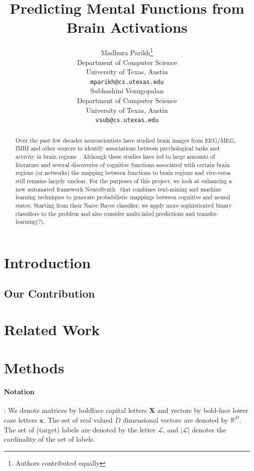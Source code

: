 \documentclass{article} %
\title{Predicting Mental Functions from Brain Activations}
\author{
Madhura Parikh\thanks{Authors contributed equally}\\
Department of Computer Science\\
University of Texas, Austin\\
\texttt{mparikh@cs.utexas.edu} \\
\And
Subhashini Venugopalan\footnotemark[1] \\
Department of Computer Science\\
University of Texas, Austin\\
\texttt{vsub@cs.utexas.edu} \\
}
\begin{document}
\maketitle

\begin{abstract}
Over the past few decades neuroscientists have studied brain images from EEG/MEG, fMRI and other sources to identify associations between psychological tasks and activity in brain regions~\cite{PMSKBY12}.
Although these studies have led to large amounts of literature and several discoveries of cognitive functions associated with certain brain regions (or networks) the mapping between functions to brain regions and vice-versa still remains largely unclear. For the purposes of this project, we look at enhancing a new automated framework NeuroSynth~\cite{yarkoni2011large}  that combines text-mining and machine learning techniques to generate probabilistic mappings between cognitive and neural states. Starting from their Naive Bayes classifier, we apply more sophisticated binary classifiers to the problem and also consider multi-label predictions and transfer-learning(?).
\end{abstract}

\section{Introduction}

\subsection{Our Contribution}

\section{Related Work}

\section{Methods}
 \paragraph{Notation}: We denote matrices by boldface capital letters $\mathbf{X}$ and vectors by bold-face lower case letters $\mathbf{x}$. The set of real valued $D$ dimensional vectors are denoted by $\mathbb{R}^D$. The set of (target) labels are denoted by the letter $\mathcal{L}$, and $|\mathcal{L}|$ denotes the cardinality of the set of labels.
\end{document}
